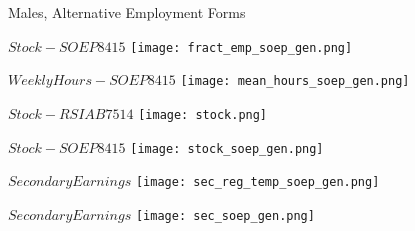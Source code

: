 \documentclass{beamer}
\begin{document}
\begin{frame}{Males, Alternative Employment Forms}
\begin{minipage}[b]{0.3\textwidth}{$Stock - SOEP8415$}
\centering
\texttt{[image: fract\_emp\_soep\_gen.png]}
\end{minipage}
\begin{minipage}[b]{0.3\textwidth}{$Weekly Hours - SOEP8415$}
\centering
\texttt{[image: mean\_hours\_soep\_gen.png]}
\end{minipage}
\begin{minipage}[b]{0.3\textwidth}{$Stock - RSIAB7514$}
\centering
\texttt{[image: stock.png]}
\end{minipage}
\begin{minipage}[b]{0.3\textwidth}{$Stock - SOEP8415$}
\centering
\texttt{[image: stock\_soep\_gen.png]}
\end{minipage}
\begin{minipage}[b]{0.3\textwidth}{$Secondary Earnings$}
\centering
\texttt{[image: sec\_reg\_temp\_soep\_gen.png]}
\end{minipage}
\begin{minipage}[b]{0.3\textwidth}{$Secondary Earnings$}
\centering
\texttt{[image: sec\_soep\_gen.png]}
\end{minipage}
\end{frame}
\end{document}
